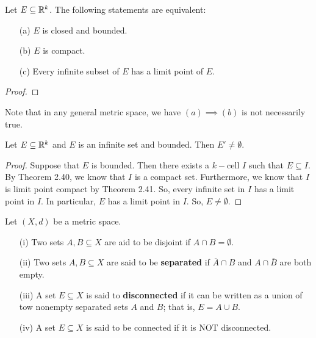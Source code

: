 \documentclass[a4paper]{report}
\begin{document}
\begin{theorem}
   Let \( E \subseteq \mathbb{R}^{k} \). The following statements are equivalent:
   \begin{enumerate}
       \item[(a)] \( E  \) is closed and bounded. 
        \item[(b)] \( E  \) is compact.
        \item[(c)] Every infinite subset of \( E  \) has a limit point of \( E  \). 
   \end{enumerate}
\end{theorem}
\begin{proof}

\end{proof}


\begin{remark}
    Note that in any general metric space, we have \( (a) \implies (b) \) is not necessarily true.
\end{remark}


\begin{theorem}
 Let \( E \subseteq \mathbb{R}^{k }  \) and \( E  \) is an infinite set and bounded. Then \( E' \neq \emptyset \).   
\end{theorem}
\begin{proof}
Suppose that \( E  \) is bounded. Then there exists a \( k- \)cell \( I  \) such that \( E \subseteq  I  \). By Theorem 2.40, we know that \( I  \) is a compact set. Furthermore, we know that \( I  \) is limit point compact by Theorem 2.41. So, every infinite set in \( I  \) has a limit point in \( I  \). In particular, \( E  \) has a limit point in \( I  \). So, \( E \neq \emptyset \).
\end{proof}

\begin{definition}
    Let \( (X,d) \) be a metric space. 
    \begin{enumerate}
        \item[(i)] Two sets \( A,B \subseteq X   \) are aid to be disjoint if \( A \cap B = \emptyset \).
        \item[(ii)] Two sets \( A,B \subseteq X  \) are said to be \textbf{separated} if \( \overline{A} \cap B  \) and \( A \cap \overline{B}  \) are both empty.
        \item [(iii)] A set \( E \subseteq X   \) is said to \textbf{disconnected} if it can be written as a union of tow nonempty separated sets \( A  \) and \( B  \); that is, \( E = A \cup B  \).
        \item[(iv)] A set \( E \subseteq X  \) is said to be connected if it is NOT disconnected.
    \end{enumerate}
\end{definition}
\end{document}
